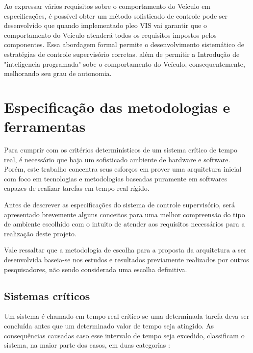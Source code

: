 \documentclass[conference]{IEEEtran}
\begin{document}
Ao expressar vários requisitos sobre o comportamento do Veículo em especificações, é possível obter um método sofisticado de controle pode ser desenvolvido que quando implementado pleo VIS vai garantir que o comportamento do Veículo atenderá todos os requisitos impostos pelos componentes. Essa abordagem formal permite o desenvolvimento sistemático de estratégias de controle supervisório corretas. além de permitir a Introdução de "inteligencia programada" sobe o comportamento do Veículo, consequentemente, melhorando seu grau de autonomia.


\section{Especificação das metodologias e ferramentas}\label{sec:specifications_tools}
Para cumprir com os critérios determinísticos de um sistema crítico de tempo real, é necessário que haja um sofisticado ambiente de hardware e software. Porém, este trabalho concentra seus esforços em prover uma arquitetura inicial com foco em tecnologias e metodologias baseadas puramente em softwares capazes de realizar tarefas em tempo real rígido.

Antes de descrever as especificações do sistema de controle supervisório, será apresentado brevemente alguns conceitos para uma melhor compreensão do tipo de ambiente escolhido com o intuito de atender aos requisitos necessários para a realização deste projeto.

Vale ressaltar que a metodologia de escolha para a proposta da arquitetura a ser desenvolvida baseia-se nos estudos e resultados previamente realizados por outros pesquisadores, não sendo considerada uma escolha definitiva.

\subsection{Sistemas críticos}\label{subsec:critical_systems}

Um sistema é chamado em tempo real crítico se uma determinada tarefa deva ser concluída antes que um determinado valor de tempo seja atingido. As consequências causadas caso esse intervalo de tempo seja excedido, classificam o sistema, na maior parte dos casos, em duas categorias \cite{Sticha_BMW_ROS}:
\end{document}
